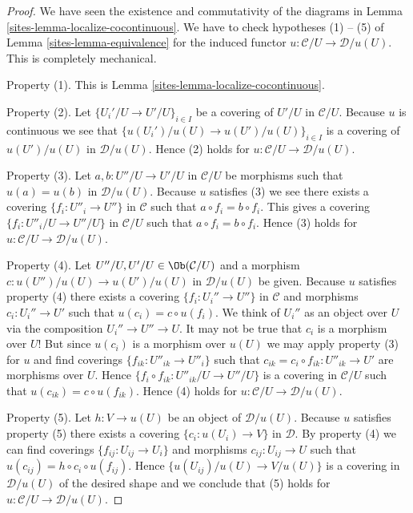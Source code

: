 \begin{proof}

We have seen the existence and commutativity of the diagrams in
Lemma \ref{sites-lemma-localize-cocontinuous}. We have to check
hypotheses (1) -- (5) of Lemma \ref{sites-lemma-equivalence} for the
induced functor $u : \mathcal{C}/U \to \mathcal{D}/u(U)$.
This is completely mechanical.

\medskip\noindent
Property (1). This is Lemma \ref{sites-lemma-localize-cocontinuous}.

\medskip\noindent
Property (2). Let $\{U_i'/U \to U'/U\}_{i \in I}$ be a covering
of $U'/U$ in $\mathcal{C}/U$. Because $u$ is continuous we see that
$\{u(U_i')/u(U) \to u(U')/u(U)\}_{i \in I}$ is a covering
of $u(U')/u(U)$ in $\mathcal{D}/u(U)$. Hence (2) holds
for $u : \mathcal{C}/U \to \mathcal{D}/u(U)$.

\medskip\noindent
Property (3). Let $a, b : U''/U \to U'/U$ in $\mathcal{C}/U$
be morphisms such that $u(a) = u(b)$ in $\mathcal{D}/u(U)$.
Because $u$ satisfies (3) we see there exists a covering
$\{f_i : U''_i \to U''\}$ in $\mathcal{C}$ such that
$a \circ f_i = b \circ f_i$. This gives a covering
$\{f_i : U''_i/U \to U''/U\}$ in $\mathcal{C}/U$ such that
$a \circ f_i = b \circ f_i$. Hence (3) holds
for $u : \mathcal{C}/U \to \mathcal{D}/u(U)$.

\medskip\noindent
Property (4). Let $U''/U, U'/U \in \Ob(\mathcal{C}/U)$ and
a morphism $c : u(U'')/u(U) \to u(U')/u(U)$ in $\mathcal{D}/u(U)$
be given. Because $u$ satisfies property (4) there exists
a covering $\{f_i : U_i'' \to U''\}$ in $\mathcal{C}$
and morphisms $c_i : U_i'' \to U'$ such that $u(c_i) = c \circ u(f_i)$.
We think of $U_i''$ as an object over $U$ via the composition
$U_i'' \to U'' \to U$.
It may not be true that $c_i$ is a morphism over $U$!
But since $u(c_i)$ is a morphism over $u(U)$ we may apply
property (3) for $u$ and find coverings $\{f_{ik} : U''_{ik} \to U''_i\}$
such that $c_{ik} = c_i \circ f_{ik} : U''_{ik} \to U'$ are morphisms over $U$.
Hence $\{f_i \circ f_{ik} : U''_{ik}/U \to U''/U\}$ is a covering
in $\mathcal{C}/U$ such that $u(c_{ik}) = c \circ u(f_{ik})$.
Hence (4) holds
for $u : \mathcal{C}/U \to \mathcal{D}/u(U)$.

\medskip\noindent
Property (5). Let $h : V \to u(U)$ be an object of $\mathcal{D}/u(U)$.
Because $u$ satisfies property (5) there exists a covering
$\{c_i : u(U_i) \to V\}$ in $\mathcal{D}$. By property (4) we can find
coverings $\{f_{ij} : U_{ij} \to U_i\}$ and morphisms
$c_{ij} : U_{ij} \to U$ such that $u(c_{ij}) = h \circ c_i \circ u(f_{ij})$.
Hence $\{u(U_{ij})/u(U) \to V/u(U)\}$ is a covering in
$\mathcal{D}/u(U)$ of the desired shape and we conclude that
(5) holds for $u : \mathcal{C}/U \to \mathcal{D}/u(U)$.
\end{proof}

